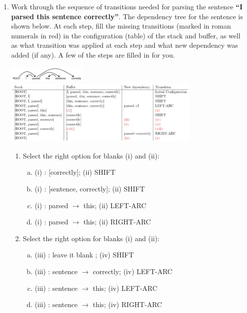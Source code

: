 \begin{enumerate}[1.]
\item Work through the sequence of transitions needed for parsing the sentence {\bf ``I parsed this sentence correctly''}. The dependency tree for the sentence is shown below. At each step, fill the missing transitions (marked in roman numerals in red) in the configuration (table) of the stack and buffer, as well as what transition was applied at each step and what new dependency was added (if any). A few of the steps are filled in for you.

\begin{center}
\includegraphics[width=0.3\textwidth]{4-1.png}
\includegraphics[width=0.75\textwidth]{4-2.png}
\end{center}

\begin{enumerate}[4a.]

\item {} Select the right option for blanks (i) and (ii):

\begin{enumerate}[(a)]
\item (i) : [correctly]; (ii) SHIFT
\item (i) : [sentence, correctly]; (ii) SHIFT
\item (i) : parsed $\rightarrow$ this; (ii) LEFT-ARC
\item (i) : parsed $\rightarrow$ this; (ii) RIGHT-ARC
\end{enumerate}


\item {} Select the right option for blanks (i) and (ii):

\begin{enumerate}[(a)]
\item (iii) : leave it blank ; (iv) SHIFT
\item (iii) : sentence $\rightarrow$ correctly; (iv) LEFT-ARC
\item (iii) : sentence $\rightarrow$ this; (iv) LEFT-ARC
\item (iii) : sentence $\rightarrow$ this; (iv) RIGHT-ARC
\end{enumerate}


\end{enumerate}
\end{enumerate}
